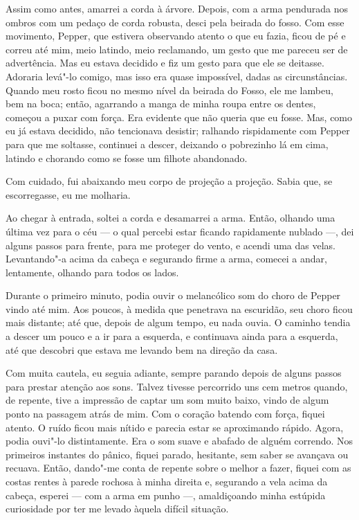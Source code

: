 Assim como antes, amarrei a corda à árvore. Depois, com a arma pendurada nos ombros com um pedaço de corda robusta,
desci pela beirada do fosso. Com esse movimento, Pepper, que estivera observando atento o que eu fazia, ficou de pé e
correu até mim, meio latindo, meio reclamando, um gesto que me pareceu ser de advertência. Mas eu estava decidido e fiz um
gesto para que ele se deitasse. Adoraria levá"-lo comigo, mas isso era quase impossível, dadas as circunstâncias. Quando
meu rosto ficou no mesmo nível da beirada do Fosso, ele me lambeu, bem na boca; então, agarrando a manga de minha
roupa entre os dentes, começou a puxar com força. Era evidente que não queria que eu fosse. Mas, como eu já estava
decidido, não tencionava desistir; ralhando rispidamente com Pepper para que me soltasse, continuei a descer,
deixando o pobrezinho lá em cima, latindo e chorando como se fosse um filhote abandonado.


Com cuidado, fui abaixando meu corpo de projeção a projeção. Sabia que, se escorregasse, eu me molharia.

Ao chegar à entrada, soltei a corda e desamarrei a arma. Então, olhando uma última vez para o céu --- o qual percebi
estar ficando rapidamente nublado ---, dei alguns passos para frente, para me proteger do vento, e acendi uma das velas.
Levantando"-a acima da cabeça e segurando firme a arma, comecei a andar, lentamente, olhando para todos os lados.

Durante o primeiro minuto, podia ouvir o melancólico som do choro de Pepper vindo até mim. Aos poucos, à medida que
penetrava na escuridão, seu choro ficou mais distante; até que, depois de algum tempo, eu nada ouvia. O caminho tendia
a descer um pouco e a ir para a esquerda, e continuava ainda para a esquerda, até que descobri que estava me levando
bem na direção da casa.

Com muita cautela, eu seguia adiante, sempre parando depois de alguns passos para prestar atenção aos sons. Talvez
tivesse percorrido uns cem metros quando, de repente, tive a impressão de captar um som muito baixo, vindo de algum ponto na
passagem atrás de mim. Com o coração batendo com força, fiquei atento. O ruído ficou mais nítido e parecia estar se
aproximando rápido. Agora, podia ouvi"-lo distintamente. Era o som suave e abafado de alguém correndo. Nos
primeiros instantes do pânico, fiquei parado, hesitante, sem saber se avançava ou recuava. Então, dando"-me conta de
repente sobre o melhor a fazer, fiquei com as costas rentes à parede rochosa à minha direita e, segurando a vela acima
da cabeça, esperei --- com a arma em punho ---, amaldiçoando minha estúpida curiosidade por ter me levado àquela difícil
situação.

